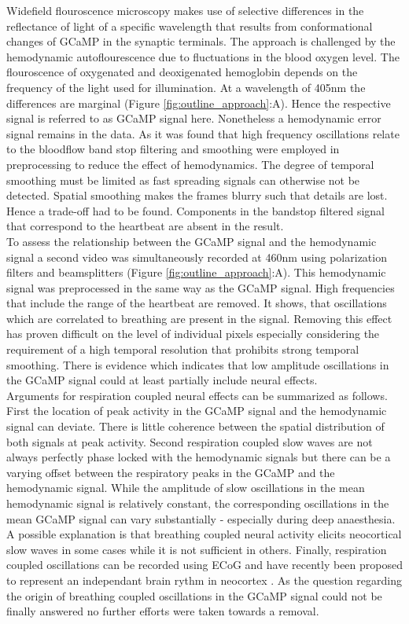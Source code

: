 Widefield flouroscence microscopy makes use of selective differences in the reflectance of light of a specific wavelength that results from conformational changes of GCaMP in the synaptic terminals. The approach is challenged by the hemodynamic autoflourescence due to fluctuations in the blood oxygen level. The flouroscence of oxygenated and deoxigenated hemoglobin depends on the frequency of the light used for illumination. At a wavelength of 405nm the differences are marginal (Figure \ref{fig:outline_approach}:A). Hence the respective signal is referred to as GCaMP signal here. Nonetheless a hemodynamic error signal remains in the data. As it was found that high frequency oscillations relate to the bloodflow band stop filtering and smoothing were employed in preprocessing to reduce the effect of hemodynamics. The degree of temporal smoothing must be limited as fast spreading signals can otherwise not be detected. Spatial smoothing makes the frames blurry such that details are lost. Hence a trade-off had to be found. Components in the bandstop filtered signal that correspond to the heartbeat are absent in the result.\\
To assess the relationship between the GCaMP signal and the hemodynamic signal a second video was simultaneously recorded at 460nm using polarization filters and beamsplitters (Figure \ref{fig:outline_approach}:A). This hemodynamic signal was preprocessed in the same way as the GCaMP signal. High frequencies that include the range of the heartbeat are removed. It shows, that oscillations which are correlated to breathing are present in the signal. Removing this effect has proven difficult on the level of individual pixels especially considering the requirement of a high temporal resolution that prohibits strong temporal smoothing. There is evidence which indicates that low amplitude oscillations in the GCaMP signal could at least partially include neural effects. \\
Arguments for respiration coupled neural effects can be summarized as follows. First the location of peak activity in the GCaMP signal and the hemodynamic signal can deviate. There is little coherence between the spatial distribution of both signals at peak activity. Second respiration coupled slow waves are not always perfectly phase locked with the hemodynamic signals but there can be a varying offset between the respiratory peaks in the GCaMP and the hemodynamic signal. While the amplitude of slow oscillations in the mean hemodynamic signal is relatively constant, the corresponding oscillations in the mean GCaMP signal can vary substantially - especially during deep anaesthesia. A possible explanation is that breathing coupled neural activity elicits neocortical slow waves in some cases while it is not sufficient in others. Finally, respiration coupled oscillations can be recorded using ECoG and have recently been proposed to represent an independant brain rythm in neocortex \parencite{tort2018parallel}. As the question regarding the origin of breathing coupled oscillations in the GCaMP signal could not be finally answered no further efforts were taken towards a removal.\\
